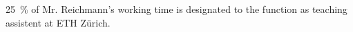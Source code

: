 
\SI{25}{\%} of Mr. Reichmann's working time is designated to the function as teaching assistent at ETH Z\"urich.